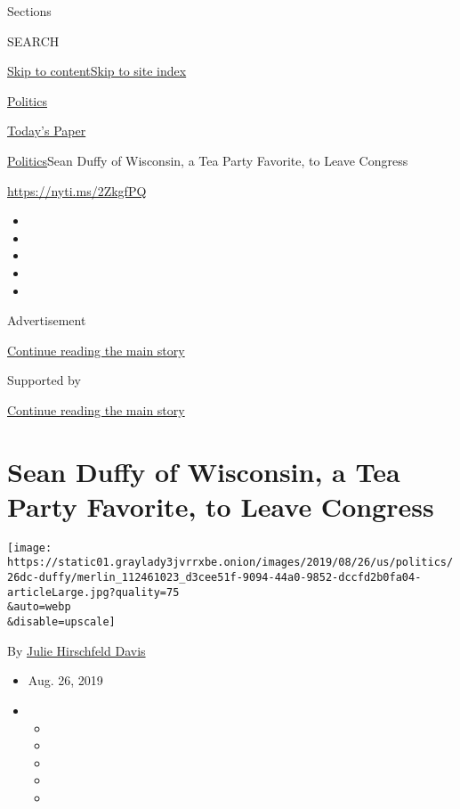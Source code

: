 Sections

SEARCH

\protect\hyperlink{site-content}{Skip to
content}\protect\hyperlink{site-index}{Skip to site index}

\href{https://www.nytimes3xbfgragh.onion/section/politics}{Politics}

\href{https://myaccount.nytimes3xbfgragh.onion/auth/login?response_type=cookie\&client_id=vi}{}

\href{https://www.nytimes3xbfgragh.onion/section/todayspaper}{Today's
Paper}

\href{/section/politics}{Politics}\textbar{}Sean Duffy of Wisconsin, a
Tea Party Favorite, to Leave Congress

\url{https://nyti.ms/2ZkgfPQ}

\begin{itemize}
\item
\item
\item
\item
\item
\end{itemize}

Advertisement

\protect\hyperlink{after-top}{Continue reading the main story}

Supported by

\protect\hyperlink{after-sponsor}{Continue reading the main story}

\hypertarget{sean-duffy-of-wisconsin-a-tea-party-favorite-to-leave-congress}{%
\section{Sean Duffy of Wisconsin, a Tea Party Favorite, to Leave
Congress}\label{sean-duffy-of-wisconsin-a-tea-party-favorite-to-leave-congress}}

\texttt{[image: https://static01.graylady3jvrrxbe.onion/images/2019/08/26/us/politics/26dc-duffy/merlin\_112461023\_d3cee51f-9094-44a0-9852-dccfd2b0fa04-articleLarge.jpg?quality=75\\\&auto=webp\\\&disable=upscale]}

By
\href{https://www.nytimes3xbfgragh.onion/by/julie-hirschfeld-davis}{Julie
Hirschfeld Davis}

\begin{itemize}
\item
  Aug. 26, 2019
\item
  \begin{itemize}
  \item
  \item
  \item
  \item
  \item
  \end{itemize}
\end{itemize}


